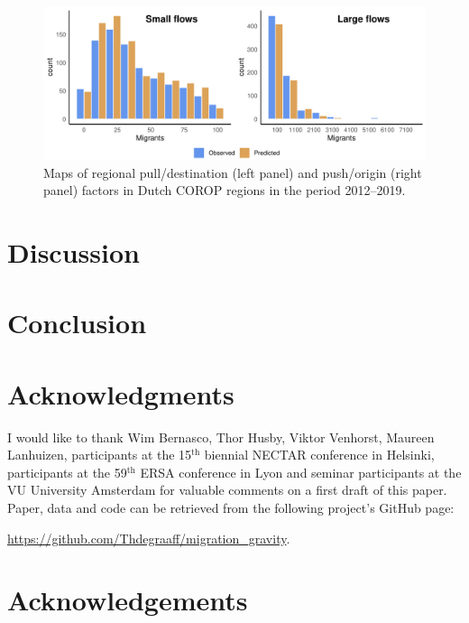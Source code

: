 \documentclass[11pt,parskip,abstracton,notitlepage, dvipsnames]{scrartcl}
\begin{document}
\begin{figure}[ht]\centering %
  \includegraphics[width=1.0\linewidth]{./../../fig/hist_fit.pdf}
  \caption{Maps of regional pull/destination (left panel) and push/origin (right panel) factors in Dutch COROP regions in the period 2012--2019.}
  \label{fig:housing_types}
\end{figure}

\section{Discussion}

\section{Conclusion}

\section*{Acknowledgments}

I would like to thank Wim Bernasco, Thor Husby, Viktor Venhorst, Maureen
Lanhuizen, participants at the 15$^{\text{th}}$ biennial NECTAR conference in
Helsinki, participants at the 59$^{\text{th}}$ ERSA conference in Lyon and
seminar participants at the VU University Amsterdam for valuable comments on a
first draft of this paper. Paper, data and code can be retrieved from the
following project's GitHub page:

\href{https://github.com/Thdegraaff/migration_gravity}{https://github.com/Thdegraaff/migration\_gravity}.



\section*{Acknowledgements}

\begin{spacing}{1.2}
	\renewcommand*{\bibfont}{\footnotesize}
	\printbibliography
\end{spacing}
\end{document}
